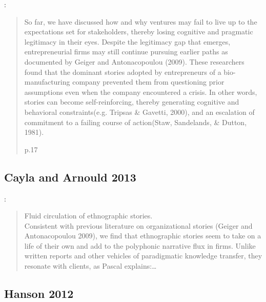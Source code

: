\cite{garud2014entrepreneurial}:
\begin{quote}
So  far,  we  have  discussed  how  and  why  ventures  may  fail  to  live  up  to  the  expectations  set  for stakeholders, thereby losing cognitive and pragmatic legitimacy in their eyes. Despite the legitimacy gap that emerges, entrepreneurial firms may still continue pursuing earlier paths as documented by Geiger and Antonacopoulou (2009). These researchers found that the dominant stories adopted by entrepreneurs of a bio-manufacturing company prevented them from questioning prior assumptions even when the company encountered a crisis. In other words, stories can become self-reinforcing, thereby generating cognitive and behavioral constraints(e.g. Tripsas \& Gavetti, 2000), and an escalation of commitment to a failing course of action(Staw, Sandelands, \& Dutton, 1981).
\begin{flushright}
p.17
\end{flushright}
\end{quote}

\subsection{Cayla and Arnould 2013}

\cite{cayla2013ethnographic}:
\begin{quote}
Fluid circulation of ethnographic stories.\\
Consistent with previous literature on organizational stories (Geiger and Antonacopoulou 2009), we find that ethnographic stories seem to take on a life of their own and add to the polyphonic narrative   flux   in   firms.   Unlike   written   reports   and   other vehicles of paradigmatic knowledge transfer, they resonate with clients, as Pascal explains:\ldots
\end{quote}

\subsection{Hanson 2012}

